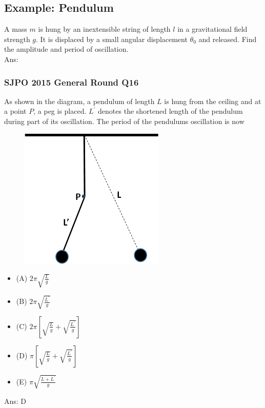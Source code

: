 \documentclass{article}
\begin{document}
\subsection{Example: Pendulum}
A mass $m$ is hung by an inextensible string of length $l$ in a gravitational field strength $g$. It is displaced by a small angular displacement $\theta_0$ and released. Find the amplitude and period of oscillation.\\[10pt]
Ans: \\[100pt]
\newpage \clearpage
\begin{samepage}
\subsubsection{SJPO 2015 General Round Q16}
As shown in the diagram, a pendulum of length $L$ is hung from the ceiling and at a point $P$, a peg is placed. $L^{\prime}$ denotes the shortened length of the pendulum during part of its oscillation. The period of the pendulums oscillation is now \\
{
\begin{figure}
\includegraphics[width=1.0\linewidth]{images/2015q16.png}
\end{figure}
\begin{itemize}
\item[](A) $2 \pi \sqrt{\frac{L}{g}}$
\item[](B) $2 \pi \sqrt{\frac{L^{\prime}}{g}}$
\item[](C) $2 \pi\left[\sqrt{\frac{L}{g}}+\sqrt{\frac{L^{\prime}}{g}}\right]$
\item[](D) $\pi\left[\sqrt{\frac{L}{g}}+\sqrt{\frac{L^{\prime}}{g}}\right]$
\item[](E) $\pi \sqrt{\frac{L+L^{\prime}}{g}}$
\end{itemize}
}
\noindent Ans: \ifpaper D \fi
\end{samepage}
\end{document}
